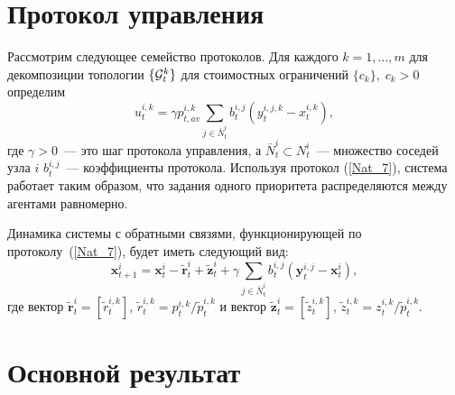 \documentclass{spisok-article}
\begin{document}

\section{Протокол управления}

Рассмотрим следующее семейство протоколов. Для каждого $k = 1, \ldots, m$ для декомпозиции топологии $\{{\cal G}_t^k\}$ для стоимостных ограничений $\{c_k\},\;c_k>0$ определим
\begin{equation}
\label{Nat_7}
{u}_{t}^{i, k} = \gamma p^{i, k}_{t, av} \sum_{j \in  \bar N_{t}^{i} } b_{t}^{i, j} (y_{t}^{i, j, k} -  x_{t}^{i, k}),
\end{equation}
где $\gamma >0$~--- это шаг протокола управления, а $\bar N_{t}^{i} \subset N_{t}^{i}$~---
множество соседей узла $i$ %
$b_t^{i, j}$~--- коэффициенты протокола. Используя протокол (\ref{Nat_7}), система работает таким образом, что задания одного приоритета распределяются между агентами равномерно. %

Динамика системы с обратными связями, функционирующей по протоколу~(\ref{Nat_7}), будет иметь следующий вид:
\begin{equation}
\label{Nat_12}
\mathbf x_{t+1}^{i} = \mathbf x_{t}^{i} - \tilde{\mathbf r}_{t}^{i} + \tilde{\mathbf z}_{t}^{i} + \gamma \sum_{j \in \bar N_{t}^{i} } b_{t}^{i, j} (\mathbf y_{t}^{i, j} - \mathbf x_{t}^{i}),
\end{equation}
где вектор $\tilde{\mathbf r}_{t}^{i} = [{\tilde r}_t^{i, k}]$, $ {\tilde r}_t^{i, k} = p_t^{i, k}/\tilde p_t^{i, k} $ и вектор $\tilde{\mathbf z}_{t}^{i} = [{\tilde z}_t^{i, k}]$, $ {\tilde z}_t^{i, k} = z_t^{i, k}/{\tilde p_t^{i, k}}.$

\section{Основной результат}
\end{document}

